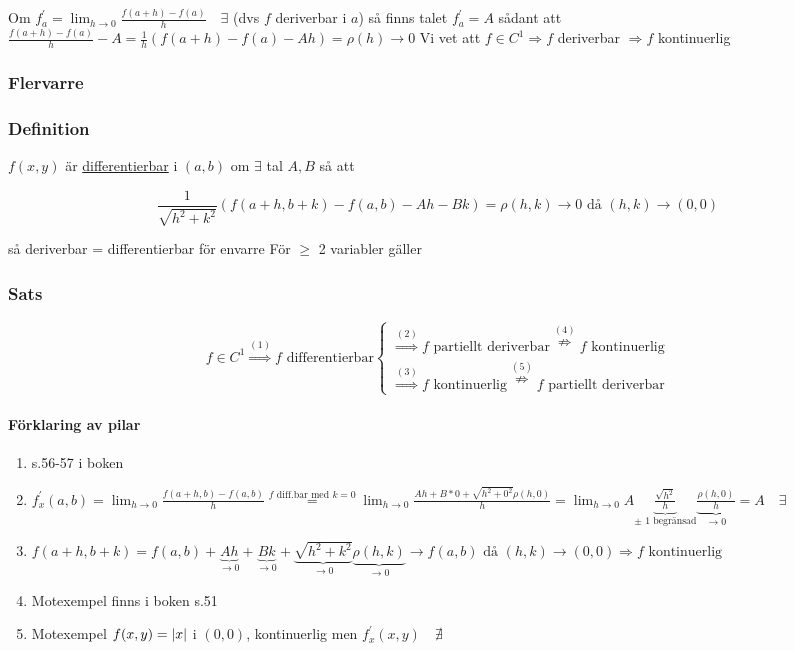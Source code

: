 \documentclass{article}
\DeclarePairedDelimiter \abs{\lvert}{\rvert}
\begin{document}
Om \(f_{a}^{\prime} = \lim_{h \rightarrow 0} \frac{f(a+h) - f(a)}{h} \quad \exists\) (dvs \(f\) deriverbar i \(a\)) så finns talet \(f_{a}^{\prime} = A\) sådant att \(\frac{f(a+h) - f(a)}{h}-A = \frac{1}{h}(f(a+h)-f(a)-Ah) = \rho(h) \rightarrow 0\) \newline \newline
Vi vet att \(f \in C^1 \Rightarrow f\) deriverbar \(\Rightarrow f\) kontinuerlig 

\subsubsection*{Flervarre}
\subsubsection{Definition}

\(f(x,y)\) är \underline{differentierbar} i \((a,b)\) om \(\exists\) tal \(A,B\) så att

\[
	\frac{1}{\sqrt{h^2+k^2}} (f(a+h,b+k) - f(a,b) - Ah - Bk) = \rho(h,k) \rightarrow 0 \text{ då } (h,k) \rightarrow (0,0)
\]

så deriverbar = differentierbar för envarre
För \(\geq\) 2 variabler gäller

\subsubsection{Sats}

\[
	f \in C^1 \overset{(1)}{\Rightarrow} f \text{ differentierbar} \left\{\begin{array}{rcl}
	\overset{(2)}{\Rightarrow} f \text{ partiellt deriverbar} \overset{(4)}{\nRightarrow} f \text{ kontinuerlig} \\
	\overset{(3)}{\Rightarrow} f \text{ kontinuerlig} \overset{(5)}{\nRightarrow} f \text{ partiellt deriverbar}
	\end{array}\right.
\]

\paragraph{Förklaring av pilar}
\begin{enumerate}
	\item s.56-57 i boken
	\item \(
				f_{x}^{\prime}(a,b) = \lim_{h \rightarrow 0} \frac{f(a+h,b) - f(a,b)}{h} \overset{f \text{ diff.bar med }k=0}{=} \lim_{h \rightarrow 0} \frac{Ah + B*0 + \sqrt{h^2 + 0^2}\rho(h,0)}{h} = \lim_{h \rightarrow 0} A \underbrace{\frac{\sqrt{h^2}}{h}}_{\pm \text{ 1 begränsad}} \underbrace{\frac{\rho(h,0)}{h}}_{\rightarrow 0} = A \quad \exists
			\)
	\item \(
				f(a+h,b+k) = f(a,b) + \underbrace{Ah}_{\rightarrow 0} + \underbrace{Bk}_{\rightarrow 0} + \underbrace{\sqrt{h^2 + k^2}}_{\rightarrow 0}\underbrace{\rho(h,k)}_{\rightarrow 0} \rightarrow f(a,b) \text{ då } (h,k) \rightarrow (0,0) \Rightarrow f \text{ kontinuerlig}
			\)
	\item Motexempel finns i boken s.51
	\item Motexempel \(f(x,y) = \abs{x}\) i \((0,0)\), kontinuerlig men \(f_{x}^{\prime}(x,y) \quad \nexists\)
\end{enumerate}
\end{document}
